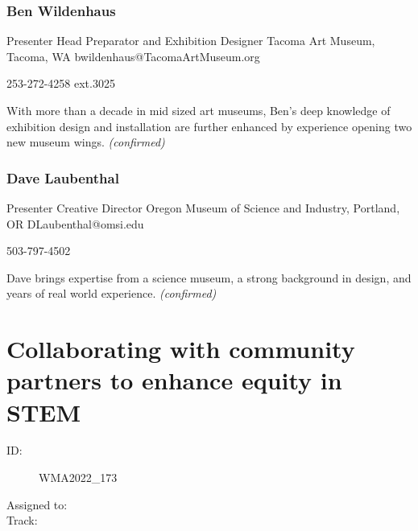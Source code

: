 \documentclass{report}
\begin{document}
              
                \subsubsection*{ Ben Wildenhaus }
                Presenter\newline
                Head Preparator and Exhibition Designer\newline
                Tacoma Art Museum, Tacoma, WA
                \newline
                bwildenhaus@TacomaArtMuseum.org\newline
                
                253-272-4258 ext.3025\newline

                With more than a decade in mid sized art museums, Ben's deep knowledge of exhibition design and installation are further enhanced by experience opening two new museum wings.
                \emph{ (confirmed) }
              

              
                \subsubsection*{ Dave Laubenthal }
                Presenter\newline
                Creative Director\newline
                Oregon Museum of Science and Industry, Portland, OR
                \newline
                DLaubenthal@omsi.edu\newline
                
                503-797-4502\newline

                Dave brings expertise from a science museum, a strong background in design, and years of real world experience.
                \emph{ (confirmed) }
              

              

              
        
          \newpage
          \section{ Collaborating with community partners to enhance equity in STEM }
            \begin{description}
              \item [ID:]
              WMA2022\_173

              \item [Assigned to:]
                \item [Track:]
              \end{description}
\end{document}
